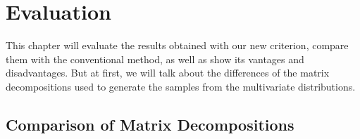 \chapter{Evaluation}\label{chap:Eval}

This chapter will evaluate the results obtained with our new criterion,
compare them with the conventional method, as well as show its vantages
and disadvantages. But at first, we will talk about the differences of
the matrix decompositions used to generate the samples from the
multivariate distributions.

\section{Comparison of Matrix Decompositions}\label{sec:evalMD}


